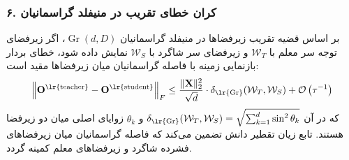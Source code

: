 \subsubsection*{۶. کران خطای تقریب در منیفلد گراسمانیان }
بر اساس قضیه تقریب زیرفضاها در منیفلد گراسمانیان $\operatorname{Gr}(d, D)$، اگر زیرفضای توجه سر معلم با $\mathcal{W}_T$ و زیرفضای سر شاگرد با $\mathcal{W}_S$ نمایش داده شود، خطای بردار بازنمایی زمینه با فاصله گراسمانیان میان زیرفضاها مقید است:
\begin{equation}
\left\| \mathbf{O}^{\text{\lr{teacher}}} - \mathbf{O}^{\text{\lr{student}}} \right\|_F \le \frac{\|\mathbf{X}\|_2^2}{\sqrt{d}} \cdot \delta_{\text{\lr{Gr}}}(\mathcal{W}_T, \mathcal{W}_S) + \mathcal{O}\left( \tau^{-1} \right)
\end{equation}
که در آن $\delta_{\text{\lr{Gr}}}(\mathcal{W}_T, \mathcal{W}_S) = \sqrt{\sum_{k=1}^d \sin^2 \theta_k}$ و $\theta_k$ زوایای اصلی میان دو زیرفضا هستند. تابع زیان تقطیر دانش تضمین می‌کند که فاصله گراسمانیان میان زیرفضاهای فشرده شاگرد و زیرفضاهای معلم کمینه گردد.

